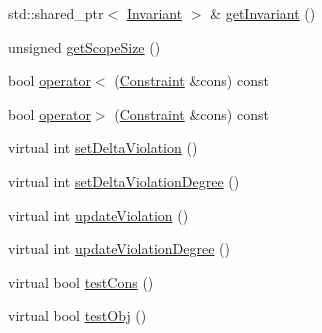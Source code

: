 \begin{DoxyCompactItemize}
\item 
std\-::shared\-\_\-ptr$<$ \hyperlink{class_invariant}{Invariant} $>$ \& \hyperlink{class_constraint_a4c202c55933908fb4e1caddf1a1711ec}{get\-Invariant} ()
\item 
unsigned \hyperlink{class_constraint_a972040ad73c82e1421c7a6ba160d1cfe}{get\-Scope\-Size} ()
\item 
bool \hyperlink{class_constraint_adc21199710e3a551b31122a8d9995c46}{operator$<$} (\hyperlink{class_constraint}{Constraint} \&cons) const 
\item 
bool \hyperlink{class_constraint_aabd1407d46c3907df989077e0a86d22b}{operator$>$} (\hyperlink{class_constraint}{Constraint} \&cons) const 
\item 
virtual int \hyperlink{class_constraint_a838ed3f4029d443c3193524be0c8f977}{set\-Delta\-Violation} ()
\item 
virtual int \hyperlink{class_constraint_aaa22c193fec13cbdc29875a1a90f65d6}{set\-Delta\-Violation\-Degree} ()
\item 
virtual int \hyperlink{class_constraint_a3dbfd62667a4d7c06fdfbd0b38608fca}{update\-Violation} ()
\item 
virtual int \hyperlink{class_constraint_a389d341b518e22981d7e8e4b8a16f739}{update\-Violation\-Degree} ()
\item 
virtual bool \hyperlink{class_constraint_affe33a000e4eedc012ae184617534225}{test\-Cons} ()
\item 
virtual bool \hyperlink{class_constraint_a564d47f24c7cdccf1c5a7b3fd91c0743}{test\-Obj} ()
\end{DoxyCompactItemize}
